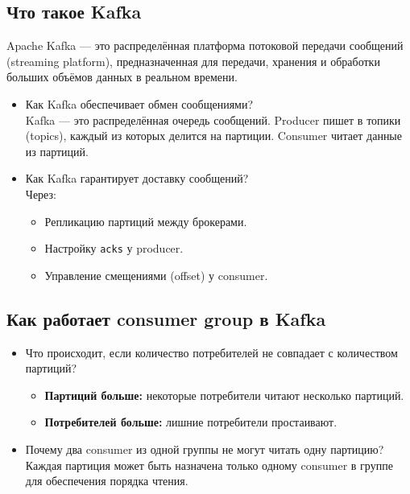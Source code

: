 \documentclass[a4paper,14pt]{article}
\begin{document}
\subsection{Что такое Kafka}
Apache Kafka — это распределённая платформа потоковой передачи сообщений (streaming platform), предназначенная для передачи, хранения и обработки больших объёмов данных в реальном времени.
\begin{itemize}
\item Как Kafka обеспечивает обмен сообщениями? \\
Kafka — это распределённая очередь сообщений. Producer пишет в топики (topics), каждый из которых делится на партиции. Consumer читает данные из партиций.

\item Как Kafka гарантирует доставку сообщений? \\
Через:
\begin{itemize}
  \item Репликацию партиций между брокерами.
  \item Настройку \texttt{acks} у producer.
  \item Управление смещениями (offset) у consumer.
\end{itemize}
\end{itemize}

\subsection{Как работает consumer group в Kafka}

\begin{itemize}
\item Что происходит, если количество потребителей не совпадает с количеством партиций? \\
\begin{itemize}
  \item \textbf{Партиций больше:} некоторые потребители читают несколько партиций.
  \item \textbf{Потребителей больше:} лишние потребители простаивают.
\end{itemize}

\item Почему два consumer из одной группы не могут читать одну партицию? \\
Каждая партиция может быть назначена только одному consumer в группе для обеспечения порядка чтения.
\end{itemize}
\end{document}
